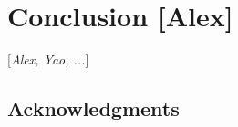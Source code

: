 \documentclass[modern,linenumbers]{aastex62}
\newcommand{\Contributors}[1]{ {\footnotesize [\textit{#1}]}}
\newcommand{\Contact}[1]{ {\footnotesize [\textbf{#1}]}}
\begin{document}



\section{Conclusion \Contact{Alex}}
\Contributors{Alex, Yao, ...}
\label{sec:conclusion}




\subsection*{Acknowledgments}












\end{document}
